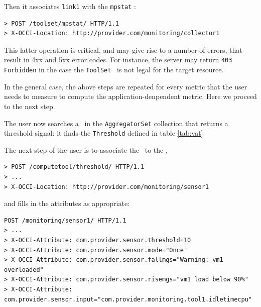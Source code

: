\documentclass[12pt]{article}  %
\begin{document}
{Then it associates {\tt link1} with the {\tt mpstat} \mi:

\begin{verbatim}
> POST /toolset/mpstat/ HTTP/1.1
> X-OCCI-Location: http://provider.com/monitoring/collector1
\end{verbatim}

This latter operation is critical, and may give rise to a number of errors, that result in 4xx and 5xx error codes. For instance, the server may return {\tt 403 Forbidden} in the case the {\tt ToolSet} \mi\ is not legal for the target resource.

In the general case, the above steps are repeated for every metric that the user needs to measure to compute the application-denpendent metric. Here we proceed to the next step. 

The user now searches a \mi\ in the {\tt AggregatorSet} collection that returns a threshold signal: it finds the {\tt Threshold} defined in table \ref{tab:vat}

\begin{table}
\scriptsize
{}

\caption{Attributes defined for the {\tt threshold} mixin \label{tab:vat}}
\end {table}

The next step of the user is to associate the \sens\ to the \mi,

\begin{verbatim}
> POST /computetool/threshold/ HTTP/1.1
> ...
> X-OCCI-Location: http://provider.com/monitoring/sensor1
\end{verbatim}
 
and fills in the attributes as appropriate:

\begin{verbatim}
POST /monitoring/sensor1/ HTTP/1.1
> ...
> X-OCCI-Attribute: com.provider.sensor.threshold=10
> X-OCCI-Attribute: com.provider.sensor.mode="Once"
> X-OCCI-Attribute: com.provider.sensor.fallmgs="Warning: vm1 overloaded"
> X-OCCI-Attribute: com.provider.sensor.risemgs="vm1 load below 90%"
> X-OCCI-Attribute: com.provider.sensor.input="com.provider.monitoring.tool1.idletimecpu"
\end{verbatim}

}
\end{document}
